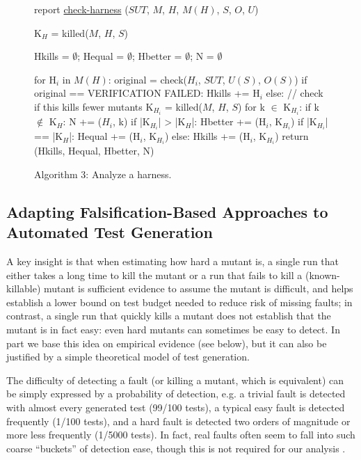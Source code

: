 \documentclass{svjour3}
\begin{document}
\begin{figure}
{\scriptsize 
\begin{code}
report {\underline{check-harness}} ($SUT$, $M$, $H$, $M(H)$, $S$, $O$, $U$) 
\vspace{0.1in}

  K$_H$ = killed($M$, $H$, $S$) 

  Hkills = $\emptyset$; Hequal = $\emptyset$; Hbetter = $\emptyset$; N = $\emptyset$

  for H$_i$ in $M(H)$:
     original = check($H_i$, $SUT$, $U(S)$, $O(S)$)
     if original == VERIFICATION FAILED: 
        Hkills += H$_i$
     else: // check if this kills fewer mutants
        K$_{H_i}$ = killed($M$, $H$, $S$)
        for k $\in$ K$_{H_i}$:
           if k $\not\in$ K$_H$: N += ($H_i$, k)
        if |K$_{H_i}$| > |K$_H$|:
           Hbetter += (H$_i$, K$_{H_i}$)
        if |K$_{H_i}$| == |K$_H$|:
           Hequal += (H$_i$, K$_{H_i}$)
        else:
           Hkills += (H$_i$, K$_{H_i}$)
  return (Hkills, Hequal, Hbetter, N)
\end{code}
}
\caption{Algorithm 3: Analyze a harness.}
\label{alg:checkharness}
\end{figure}


\subsection{Adapting Falsification-Based Approaches to Automated Test
  Generation}

A key insight is that when estimating how hard a mutant is, a single
run that either takes a long time to kill the mutant or a run that
fails to kill a (known-killable) mutant is sufficient evidence to
assume the mutant is difficult, and helps establish a lower bound on
test budget needed to reduce risk of missing faults; in contrast, a
single run that quickly kills a mutant does not establish that the
mutant is in fact easy:  even hard mutants can sometimes be easy to
detect.  In part we base this idea on empirical evidence (see below),
but it can also be justified by a simple theoretical model of test
generation.  

The difficulty of detecting a fault (or killing a mutant, which is
equivalent) can be simply expressed by a probability of detection,
e.g. a trivial fault is detected with almost every generated test
(99/100 tests), a typical easy fault is detected frequently (1/100
tests), and a hard fault is detected two orders of magnitude or more
less frequently (1/5000 tests).  In fact, real faults often seem to
fall into such coarse ``buckets'' of detection ease, though this is not
required for our analysis \cite{PLDI13}.  
\end{document}
